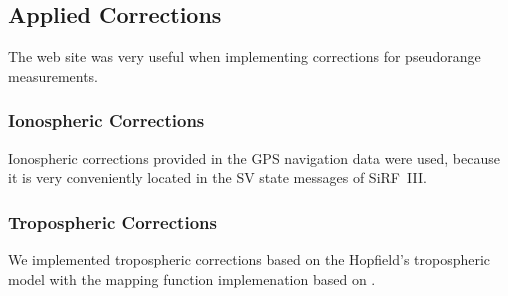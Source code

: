 \subsection{Applied Corrections}
\label{sec:impl-corrections}
The web site \cite{sam-www} was very useful when implementing corrections for
pseudorange measurements.

\subsubsection{Ionospheric Corrections}
Ionospheric corrections provided in the GPS navigation data were used, because
it is very conveniently located in the SV state messages of SiRF~III.

\subsubsection{Tropospheric Corrections}
We implemented tropospheric corrections based on the Hopfield's tropospheric model
with the mapping function implemenation based on \cite{sam-www}.


